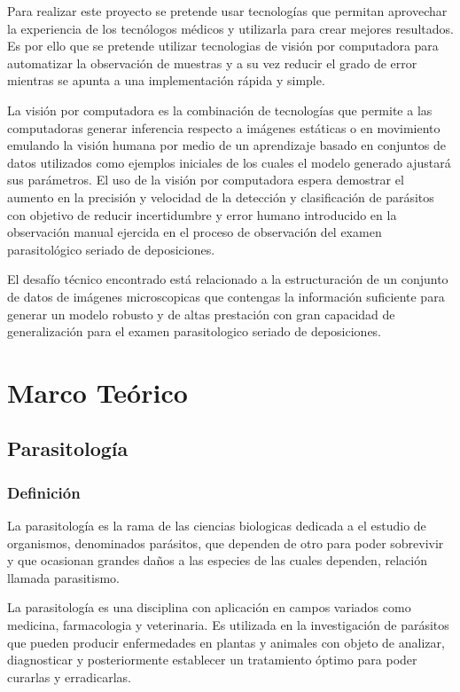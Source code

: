 \documentclass[letter,12pt]{report}
\begin{document}
    Para realizar este proyecto se pretende usar tecnologías que permitan aprovechar la
    experiencia de los tecnólogos médicos y utilizarla para crear mejores resultados.
    Es por ello que se pretende utilizar tecnologias de visión por computadora para
    automatizar la observación de muestras y a su vez reducir el grado de error mientras
    se apunta a una implementación rápida y simple.

    La visión por computadora es la combinación de tecnologías que permite a las
    computadoras generar inferencia respecto a imágenes estáticas o en movimiento
    emulando la visión humana por medio de un aprendizaje basado en conjuntos de datos
    utilizados como ejemplos iniciales de los cuales el modelo generado ajustará sus
    parámetros. %
    El uso de la visión por computadora espera demostrar el aumento en la precisión y
    velocidad de la detección y clasificación de parásitos con objetivo de reducir
    incertidumbre y error humano introducido en la observación manual ejercida en el proceso
    de observación del examen parasitológico seriado de deposiciones. 

    El desafío técnico encontrado está relacionado a la estructuración de un conjunto de
    datos de imágenes microscopicas que contengas la información suficiente para generar
    un modelo robusto y de altas prestación con gran capacidad de generalización para el
    examen parasitologico seriado de deposiciones.


\chapter{Marco Teórico}\label{teorico}

\section{Parasitología}
\subsection{Definición}
La parasitología es la rama de las ciencias biologicas dedicada a el estudio de
organismos, denominados parásitos, que dependen de otro para poder sobrevivir y que
ocasionan grandes daños a las especies de las cuales dependen, relación llamada
parasitismo.

La parasitología es una disciplina con aplicación en campos variados como medicina,
farmacologia y veterinaria. Es utilizada en la investigación de parásitos que pueden
producir enfermedades en plantas y animales con objeto de analizar, diagnosticar y
posteriormente establecer un tratamiento óptimo para poder curarlas y erradicarlas.
\end{document}
